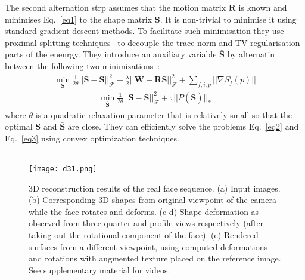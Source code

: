 \documentclass[10pt,twocolumn,letterpaper]{article}
\begin{document}
The second alternation strp assumes that the motion matrix $\mathbf{R}$ is known and minimises Eq.~\ref{eq1} to the shape matrix $\mathbf{S}$. It is non-trivial to minimise it using standard gradient descent methods. To facilitate such minimisation they use proximal splitting techniques~\cite{A} to decouple the trace norm and TV regularisation parts of the enenrgy. They introduce an auxiliary variable $\bar{\mathbf{S}}$ by alternatin between the following two minimizations~\cite{dense}:\\
\begin{gather}
\mathop{\min}\limits_{\mathbf{S}}\frac{1}{2\theta}||\mathbf{S} - \bar{\mathbf{S}}||_{\mathcal{F}}^2 + \frac{\lambda}{2}||\mathbf{W} - \mathbf{RS}||_{\mathcal{F}}^2 + \sum_{f,i,p}||\nabla S_f^i(p)||
\label{eq2}
\end{gather}
\begin{gather}
\mathop{\min}\limits_{\bar{\mathbf{S}}}\frac{1}{2\theta}||\mathbf{S} - \bar{\mathbf{S}}||_{\mathcal{F}}^2 + \tau||P(\bar{\mathbf{S}})||_{\ast}
\label{eq3}
\end{gather}
where $\theta$ is a quadratic relaxation parameter that is relatively small so that the optimal $\mathbf{S}$ and $\bar{\mathbf{S}}$ are close. They can efficiently solve the problems Eq.~\ref{eq2} and Eq.~\ref{eq3} using convex optimization techniques.\\
\\

\begin{figure*}
\begin{center}
\texttt{[image: d31.png]}
\end{center}
\caption{3D reconstruction results of the real face sequence. (a) Input images. (b) Corresponding 3D shapes from original viewpoint of the camera while the face rotates and deforms. (c-d) Shape deformation as observed from three-quarter and profile views respectively (after taking out the rotational component of the face). (e) Rendered surfaces from a different viewpoint, using computed deformations and rotations with augmented texture placed on the reference image. See supplementary material for videos.}
\label{fig}
\end{figure*}
\end{document}
